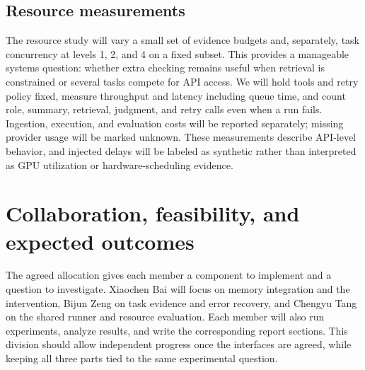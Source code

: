\documentclass[a4paper,11pt]{article}
\begin{document}
\subsection{Resource measurements}
The resource study will vary a small set of evidence budgets and, separately, task concurrency at levels 1, 2, and 4 on a fixed subset. This provides a manageable systems question: whether extra checking remains useful when retrieval is constrained or several tasks compete for API access. We will hold tools and retry policy fixed, measure throughput and latency including queue time, and count role, summary, retrieval, judgment, and retry calls even when a run fails. Ingestion, execution, and evaluation costs will be reported separately; missing provider usage will be marked unknown. These measurements describe API-level behavior, and injected delays will be labeled as synthetic rather than interpreted as GPU utilization or hardware-scheduling evidence.\par

\clearpage
\section{Collaboration, feasibility, and expected outcomes}
The agreed allocation gives each member a component to implement and a question to investigate. Xiaochen Bai will focus on memory integration and the intervention, Bijun Zeng on task evidence and error recovery, and Chengyu Tang on the shared runner and resource evaluation. Each member will also run experiments, analyze results, and write the corresponding report sections. This division should allow independent progress once the interfaces are agreed, while keeping all three parts tied to the same experimental question.\par
\end{document}
